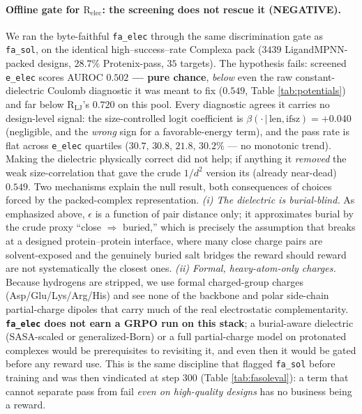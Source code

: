 \documentclass[11pt]{article}
\newcommand{\R}{\mathrm{R}}
\newcommand{\ttk}[1]{\texttt{\small #1}}
\begin{document}
\paragraph{Offline gate for $\R_{\mathrm{elec}}$: the screening does not rescue it (NEGATIVE).} We ran
the byte-faithful \ttk{fa\_elec} through the same discrimination gate as \ttk{fa\_sol}, on the identical
high--success--rate Complexa pack ($3439$ LigandMPNN-packed designs, $28.7\%$ Protenix-pass, $35$
targets). The hypothesis fails: screened \ttk{e\_elec} scores AUROC \textbf{$0.502$ --- pure chance},
\emph{below} even the raw constant-dielectric Coulomb diagnostic it was meant to fix ($0.549$, Table
\ref{tab:potentials}) and far below $\R_{\mathrm{LJ}}$'s $0.720$ on this pool. Every diagnostic agrees
it carries no design-level signal: the size-controlled logit coefficient is
$\beta(\cdot\,|\,\text{len},\text{ifsz})={+}0.040$ (negligible, and the \emph{wrong} sign for a
favorable-energy term), and the pass rate is flat across \ttk{e\_elec} quartiles
($30.7,\,30.8,\,21.8,\,30.2\%$ --- no monotonic trend). Making the dielectric physically correct did
not help; if anything it \emph{removed} the weak size-correlation that gave the crude $1/d^2$ version
its (already near-dead) $0.549$. Two mechanisms explain the null result, both consequences of choices
forced by the packed-complex representation. \emph{(i) The dielectric is burial-blind.} As emphasized
above, $\epsilon$ is a function of pair distance only; it approximates burial by the crude proxy
``close $\Rightarrow$ buried,'' which is precisely the assumption that breaks at a designed
protein--protein interface, where many close charge pairs are solvent-exposed and the genuinely buried
salt bridges the reward should reward are not systematically the closest ones. \emph{(ii) Formal,
heavy-atom-only charges.} Because hydrogens are stripped, we use formal charged-group charges
(Asp/Glu/Lys/Arg/His) and see none of the backbone and polar side-chain partial-charge dipoles that
carry much of the real electrostatic complementarity. \textbf{\ttk{fa\_elec} does not earn a GRPO run
on this stack}; a burial-aware dielectric (SASA-scaled or generalized-Born) or a full partial-charge
model on protonated complexes would be prerequisites to revisiting it, and even then it would be gated
before any reward use. This is the same discipline that flagged \ttk{fa\_sol} before training and was
then vindicated at step $300$ (Table \ref{tab:fasoleval}): a term that cannot separate pass from fail
\emph{even on high-quality designs} has no business being a reward.
\end{document}
